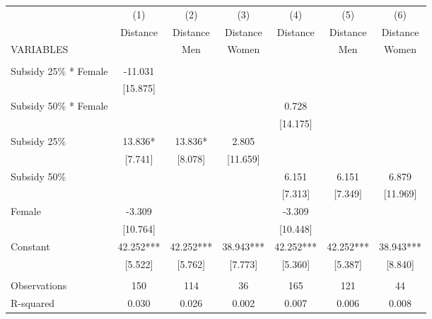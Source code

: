 \begin{tabular}{lcccccc} \hline
 & (1) & (2) & (3) & (4) & (5) & (6) \\
 & Distance & Distance & Distance & Distance & Distance & Distance \\
VARIABLES &  & Men & Women &  & Men & Women \\ \hline
 &  &  &  &  &  &  \\
Subsidy 25\% * Female & -11.031 &  &  &  &  &  \\
 & [15.875] &  &  &  &  &  \\
Subsidy 50\% * Female &  &  &  & 0.728 &  &  \\
 &  &  &  & [14.175] &  &  \\
Subsidy 25\% & 13.836* & 13.836* & 2.805 &  &  &  \\
 & [7.741] & [8.078] & [11.659] &  &  &  \\
Subsidy 50\% &  &  &  & 6.151 & 6.151 & 6.879 \\
 &  &  &  & [7.313] & [7.349] & [11.969] \\
Female & -3.309 &  &  & -3.309 &  &  \\
 & [10.764] &  &  & [10.448] &  &  \\
Constant & 42.252*** & 42.252*** & 38.943*** & 42.252*** & 42.252*** & 38.943*** \\
 & [5.522] & [5.762] & [7.773] & [5.360] & [5.387] & [8.840] \\
 &  &  &  &  &  &  \\
Observations & 150 & 114 & 36 & 165 & 121 & 44 \\
 R-squared & 0.030 & 0.026 & 0.002 & 0.007 & 0.006 & 0.008 \\ \hline
\end{tabular}
